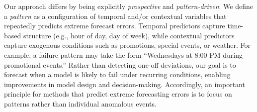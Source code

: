 \documentclass[]{interact}
\theoremstyle{definition}
\begin{document}
Our approach differs by being explicitly \emph{prospective} and \emph{pattern-driven}. We define a \emph{pattern} as a configuration of temporal and/or contextual variables that repeatedly predicts extreme forecast errors. Temporal predictors capture time-based structure (e.g., hour of day, day of week), while contextual predictors capture exogenous conditions such as promotions, special events, or weather. For example, a failure pattern may take the form “Wednesdays at 8:00 PM during promotional events.” Rather than detecting one-off deviations, our goal is to forecast when a model is likely to fail under recurring conditions, enabling improvements in model design and decision-making. Accordingly, an important principle for methods that predict extreme forecasting errors is to focus on patterns rather than individual anomalous events.
\end{document}
